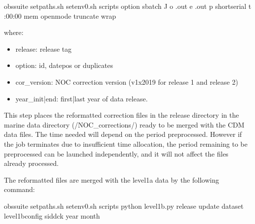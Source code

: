 \documentclass[letterpaper,10pt,english]{sphinxmanual}
\begin{document}
\begin{sphinxVerbatim}[commandchars=\\\{\}]
 obs\PYGZhy{}suite
 setpaths.sh
 setenv0.sh
 scripts
option
sbatch \PYGZhy{}J  \PYGZhy{}o .out \PYGZhy{}e .out \PYGZhy{}p short\PYGZhy{}serial \PYGZhy{}t :00:00 \PYGZhy{}\PYGZhy{}mem  \PYGZhy{}\PYGZhy{}open\PYGZhy{}mode truncate \PYGZhy{}\PYGZhy{}wrap
\end{sphinxVerbatim}

where:
\begin{itemize}
\item {} 
release: release tag

\item {} 
option: id, datepos or duplicates

\item {} 
cor\_version: NOC correction version (v1x2019 for release 1 and release 2)

\item {} 
year\_init|end: first|last year of data release.

\end{itemize}

This step places the reformatted correction files in the release directory in
the marine data directory (/NOC\_corrections/) ready to be
merged with the CDM data files. The time needed will depend on the period
pre\sphinxhyphen{}processed. However if the job terminates due to insufficient time allocation,
the period remaining to be pre\sphinxhyphen{}processed can be launched independently, and it
will not affect the files already processed.

The reformatted files are merged with the level1a data by the following command:

\begin{sphinxVerbatim}[commandchars=\\\{\}]
 obs\PYGZhy{}suite
 setpaths.sh
 setenv0.sh
 scripts
python level1b.py  release update dataset level1b\PYGZus{}config sid\PYGZhy{}dck year month
\end{sphinxVerbatim}
\end{document}
